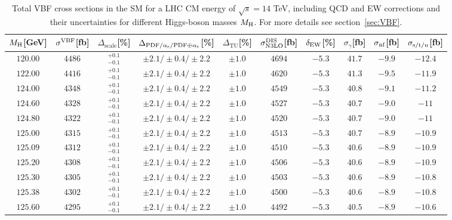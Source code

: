 \begin{table}[ht]
\caption{Total VBF cross sections in the SM for a LHC CM energy of $\sqrt{s}=14$ TeV, including QCD and EW corrections
and their uncertainties for different Higgs-boson masses $M_\mathrm{H}$. For more details see section~\ref{sec:VBF}.}
\label{tab:vbf_XStot_14}
\begin{center}%
\begin{small}%
\begin{tabular}{cccccccc|cc}%
\toprule
$M_\mathrm{H}$[GeV] & $\sigma^{\mathrm{VBF}}$[fb] & $\Delta_{\mathrm{scale}}$[\%] & $\Delta_{\mathrm{PDF}/\alpha_{\mathrm{s}}/\mathrm{PDF\oplus\alpha_{\mathrm{s}}}}$[\%] & $\Delta_{\mathrm{TU}}$[\%] &
$\sigma_{\mathrm{N3LO}}^{\mathrm{DIS}}$[fb] & $\delta_{\mathrm{EW}}$[\%] & $\sigma_{\gamma}$[fb] & $\sigma_{\mbox{\scriptsize nf}}$[fb] & $\sigma_{\mbox{\scriptsize s/t/u}}$[fb]
\\
\midrule
$120.00$ & $4486$ & $^{+0.1}_{-0.1}$ & $\pm 2.1/\pm 0.4/\pm 2.2$ & $\pm 1.0$ & $4694$ & $-5.3$ & $41.7$ & $-9.9$ & $-12.4$ \\
$122.00$ & $4416$ & $^{+0.1}_{-0.1}$ & $\pm 2.1/\pm 0.4/\pm 2.2$ & $\pm 1.0$ & $4620$ & $-5.3$ & $41.3$ & $-9.5$ & $-11.9$ \\
$124.00$ & $4348$ & $^{+0.1}_{-0.1}$ & $\pm 2.1/\pm 0.4/\pm 2.2$ & $\pm 1.0$ & $4549$ & $-5.3$ & $40.8$ & $-9.1$ & $-11.2$ \\
$124.60$ & $4328$ & $^{+0.1}_{-0.1}$ & $\pm 2.1/\pm 0.4/\pm 2.2$ & $\pm 1.0$ & $4527$ & $-5.3$ & $40.7$ & $-9.0$ & $-11  $ \\
$124.80$ & $4322$ & $^{+0.1}_{-0.1}$ & $\pm 2.1/\pm 0.4/\pm 2.2$ & $\pm 1.0$ & $4520$ & $-5.3$ & $40.7$ & $-9.0$ & $-11  $ \\
$125.00$ & $4315$ & $^{+0.1}_{-0.1}$ & $\pm 2.1/\pm 0.4/\pm 2.2$ & $\pm 1.0$ & $4513$ & $-5.3$ & $40.7$ & $-8.9$ & $-10.9$ \\
$125.09$ & $4312$ & $^{+0.1}_{-0.1}$ & $\pm 2.1/\pm 0.4/\pm 2.2$ & $\pm 1.0$ & $4510$ & $-5.3$ & $40.6$ & $-8.9$ & $-10.9$ \\
$125.20$ & $4308$ & $^{+0.1}_{-0.1}$ & $\pm 2.1/\pm 0.4/\pm 2.2$ & $\pm 1.0$ & $4506$ & $-5.3$ & $40.6$ & $-8.9$ & $-10.9$ \\
$125.30$ & $4305$ & $^{+0.1}_{-0.1}$ & $\pm 2.1/\pm 0.4/\pm 2.2$ & $\pm 1.0$ & $4503$ & $-5.3$ & $40.6$ & $-8.9$ & $-10.8$ \\
$125.38$ & $4302$ & $^{+0.1}_{-0.1}$ & $\pm 2.1/\pm 0.4/\pm 2.2$ & $\pm 1.0$ & $4500$ & $-5.3$ & $40.6$ & $-8.9$ & $-10.8$ \\
$125.60$ & $4295$ & $^{+0.1}_{-0.1}$ & $\pm 2.1/\pm 0.4/\pm 2.2$ & $\pm 1.0$ & $4492$ & $-5.3$ & $40.5$ & $-8.9$ & $-10.6$ \\

\end{tabular}
\end{small}
\end{center}
\end{table}
